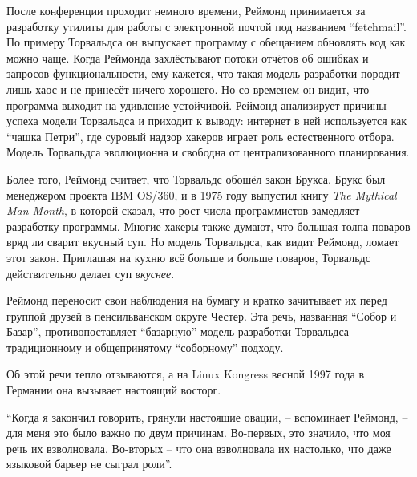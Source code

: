 После конференции проходит немного времени, Реймонд принимается за разработку утилиты для работы с электронной почтой под названием ``fetchmail''. По примеру Торвальдса он выпускает программу с обещанием обновлять код как можно чаще. Когда Реймонда захлёстывают потоки отчётов об ошибках и запросов функциональности, ему кажется, что такая модель разработки породит лишь хаос и не принесёт ничего хорошего. Но со временем он видит, что программа выходит на удивление устойчивой. Реймонд анализирует причины успеха модели Торвальдса и приходит к выводу: интернет в ней используется как ``чашка Петри'', где суровый надзор хакеров играет роль естественного отбора. Модель Торвальдса эволюционна и свободна от централизованного планирования.

Более того, Реймонд считает, что Торвальдс обошёл закон Брукса. Брукс был менеджером проекта IBM OS/360, и в 1975 году выпустил книгу \textit{The Mythical Man-Month}, в которой сказал, что рост числа программистов замедляет разработку программы. Многие хакеры также думают, что большая толпа поваров вряд ли сварит вкусный суп. Но модель Торвальдса, как видит Реймонд, ломает этот закон. Приглашая на кухню всё больше и больше поваров, Торвальдс действительно делает суп \textit{вкуснее}. 

Реймонд переносит свои наблюдения на бумагу и кратко зачитывает их перед группой друзей в пенсильванском округе Честер. Эта речь, названная ``Собор и Базар'', противопоставляет ``базарную'' модель разработки Торвальдса традиционному и общепринятому ``соборному'' подходу.

Об этой речи тепло отзываются, а на Linux Kongress весной 1997 года в Германии она вызывает настоящий восторг.

``Когда я закончил говорить, грянули настоящие овации, -- вспоминает Реймонд, -- для меня это было важно по двум причинам. Во-первых, это значило, что моя речь их взволновала. Во-вторых -- что она взволновала их настолько, что даже языковой барьер не сыграл роли''.

